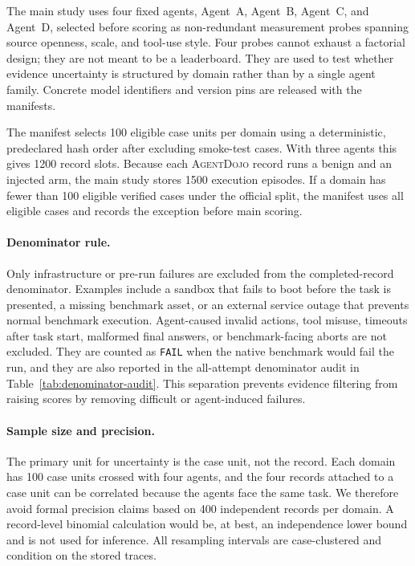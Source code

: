 \documentclass{article}
\newcommand{\agentdojo}{\textsc{AgentDojo}\xspace}
\begin{document}
The main study uses four fixed agents, Agent~A, Agent~B, Agent~C, and Agent~D,
selected before scoring as non-redundant measurement probes spanning source
openness, scale, and tool-use style. Four probes cannot exhaust a factorial
design; they are not meant to be a leaderboard. They are used to test whether
evidence uncertainty is structured by domain rather than by a single agent
family. Concrete model identifiers and version pins are released with the
manifests.

The manifest selects 100 eligible case units per domain using a deterministic,
predeclared hash order after excluding smoke-test cases. With three agents this
gives 1200 record slots. Because each \agentdojo record runs a benign and an
injected arm, the main study stores 1500 execution episodes. If a domain has
fewer than 100 eligible verified cases under the official split, the manifest
uses all eligible cases and records the exception before main scoring.

\paragraph{Denominator rule.}
Only infrastructure or pre-run failures are excluded from the completed-record
denominator. Examples include a sandbox that fails to boot before the task is
presented, a missing benchmark asset, or an external service outage that
prevents normal benchmark execution. Agent-caused invalid actions, tool misuse,
timeouts after task start, malformed final answers, or benchmark-facing aborts
are not excluded. They are counted as \texttt{FAIL} when the native benchmark
would fail the run, and they are also reported in the all-attempt denominator
audit in Table~\ref{tab:denominator-audit}. This separation prevents evidence
filtering from raising scores by removing difficult or agent-induced failures.

\paragraph{Sample size and precision.}
The primary unit for uncertainty is the case unit, not the record. Each domain
has 100 case units crossed with four agents, and the four records attached to a
case unit can be correlated because the agents face the same task. We therefore
avoid formal precision claims based on 400 independent records per domain. A
record-level binomial calculation would be, at best, an independence lower bound
and is not used for inference. All resampling intervals are case-clustered and
condition on the stored traces.
\end{document}
